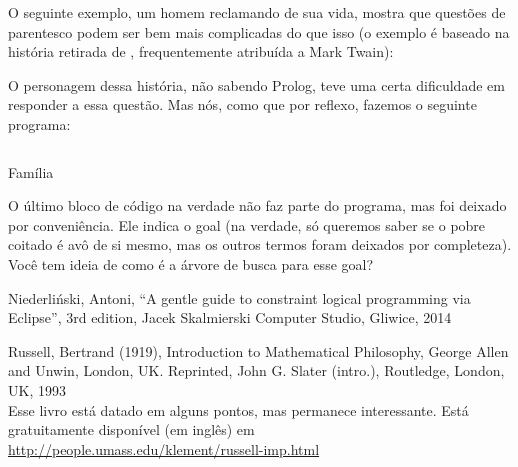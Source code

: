 O seguinte exemplo, um homem reclamando de sua vida, mostra que questões de parentesco podem ser bem
mais complicadas do que isso (o exemplo é baseado na história retirada de \cite{antoni}, frequentemente
atribuída a Mark Twain):


O personagem dessa história, não sabendo Prolog, teve uma certa dificuldade em responder a essa
questão. Mas nós, como que por reflexo, fazemos o seguinte programa:

    \begin{listing}[H]
\inputminted{prolog}{../Exemplos/Cap5/prog1_family.pl}
\caption{Família}
    \end{listing}

O último bloco de código na verdade não faz parte do programa, mas foi deixado por conveniência. Ele
indica o goal (na verdade, só queremos saber se o pobre coitado é avô de si mesmo, mas os outros
termos foram deixados por completeza). Você tem ideia de como é a árvore de busca para esse goal?



  \begin{thebibliography}{2}

    Niederliński, Antoni,
    ``A gentle guide to constraint logical programming via Eclipse'',
    3rd edition, Jacek Skalmierski Computer Studio, Gliwice, 2014

     Russell, Bertrand (1919), Introduction to Mathematical Philosophy, George Allen and Unwin, London, UK. Reprinted, John G. Slater (intro.), Routledge, London, UK, 1993
    \\Esse livro está datado em alguns pontos, mas permanece interessante. Está gratuitamente
    disponível (em inglês) em \url{http://people.umass.edu/klement/russell-imp.html}

  \end{thebibliography}

%
